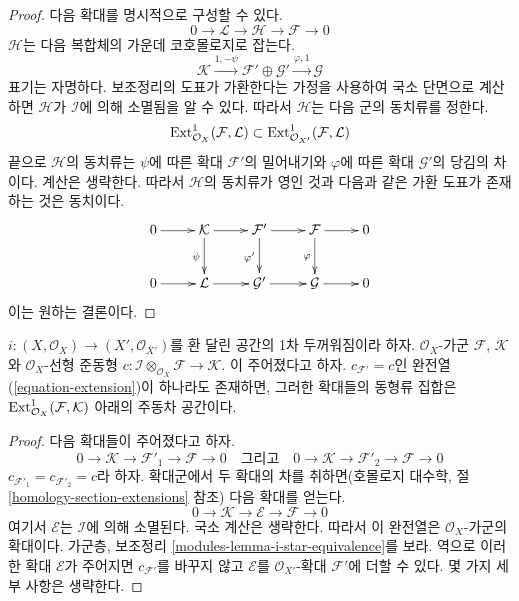 \begin{proof}
다음 확대를 명시적으로 구성할 수 있다.
$$
0 \to \mathcal{L} \to \mathcal{H} \to \mathcal{F} \to 0
$$
$\mathcal{H}$는 다음 복합체의 가운데 코호몰로지로 잡는다.
$$
\mathcal{K}
\xrightarrow{1, - \psi}
\mathcal{F}' \oplus \mathcal{G}' \xrightarrow{\varphi, 1}
\mathcal{G}
$$
표기는 자명하다. 보조정리의 도표가 가환한다는 가정을 사용하여 국소
단면으로 계산하면 $\mathcal{H}$가 $\mathcal{I}$에 의해 소멸됨을 알 수
있다. 따라서 $\mathcal{H}$는 다음 군의 동치류를 정한다.
$$
\mathop{\mathrm{Ext}}\nolimits^1_{\mathcal{O}_X}(\mathcal{F}, \mathcal{L})
\subset
\mathop{\mathrm{Ext}}\nolimits^1_{\mathcal{O}_{X'}}(\mathcal{F}, \mathcal{L})
$$
끝으로 $\mathcal{H}$의 동치류는 $\psi$에 따른 확대 $\mathcal{F}'$의
밀어내기와 $\varphi$에 따른 확대 $\mathcal{G}'$의 당김의 차이다.
계산은 생략한다. 따라서 $\mathcal{H}$의 동치류가 영인 것과 다음과 같은
가환 도표가 존재하는 것은 동치이다.
$$
\xymatrix{
0 \ar[r] &
\mathcal{K} \ar[r] \ar[d]_{\psi} &
\mathcal{F}' \ar[r] \ar[d]_{\varphi'} &
\mathcal{F} \ar[r] \ar[d]_\varphi & 0\\
0 \ar[r] &
\mathcal{L} \ar[r] &
\mathcal{G}' \ar[r] &
\mathcal{G} \ar[r] & 0
}
$$
이는 원하는 결론이다.
\end{proof}

\begin{lemma}
\label{lemma-inf-ext}
$i:(X,\mathcal{O}_X)\to(X',\mathcal{O}_{X'})$를 환 달린 공간의
1차 두꺼워짐이라 하자. $\mathcal{O}_X$-가군 $\mathcal{F}$,
$\mathcal{K}$와 $\mathcal{O}_X$-선형 준동형
$c : \mathcal{I} \otimes_{\mathcal{O}_X} \mathcal{F} \to \mathcal{K}$.
이 주어졌다고 하자. $c_{\mathcal{F}'}=c$인 완전열
(\ref{equation-extension})이 하나라도 존재하면, 그러한 확대들의 동형류
집합은 $\mathop{\mathrm{Ext}}\nolimits^1_{\mathcal{O}_X}(\mathcal{F},\mathcal{K})$ 아래의
주동차 공간이다.
\end{lemma}

\begin{proof}
다음 확대들이 주어졌다고 하자.
$$
0 \to \mathcal{K} \to \mathcal{F}'_1 \to \mathcal{F} \to 0
\quad\text{그리고}\quad
0 \to \mathcal{K} \to \mathcal{F}'_2 \to \mathcal{F} \to 0
$$
$c_{\mathcal{F}'_1}=c_{\mathcal{F}'_2}=c$라 하자. 확대군에서 두 확대의
차를 취하면(호몰로지 대수학, 절 \ref{homology-section-extensions} 참조)
다음 확대를 얻는다.
$$
0 \to \mathcal{K} \to \mathcal{E} \to \mathcal{F} \to 0
$$
여기서 $\mathcal{E}$는 $\mathcal{I}$에 의해 소멸된다. 국소 계산은
생략한다. 따라서 이 완전열은 $\mathcal{O}_X$-가군의 확대이다.
가군층, 보조정리 \ref{modules-lemma-i-star-equivalence}를 보라.
역으로 이러한 확대 $\mathcal{E}$가 주어지면
$c_{\mathcal{F}'}$를 바꾸지 않고 $\mathcal{E}$를
$\mathcal{O}_{X'}$-확대 $\mathcal{F}'$에 더할 수 있다. 몇 가지
세부 사항은 생략한다.
\end{proof}

